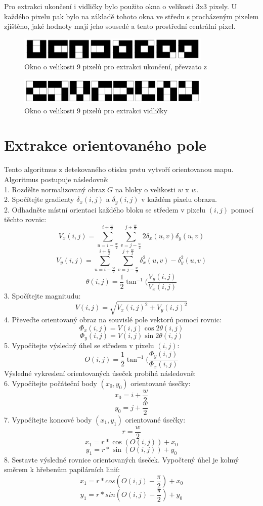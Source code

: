 Pro extrakci ukončení i vidličky bylo použito okna o velikosti 3x3 pixely. U každého pixelu pak bylo na základě tohoto okna ve středu s procházeným pixelem zjištěno, jaké hodnoty mají jeho sousedé a tento prostřední centrální pixel. 

\begin{figure}[htbp]
    \centering
    \includegraphics[width=350px]{obrazky-figures/windowridge.png}
    \caption{Okno o velikosti 9 pixelů pro extrakci ukončení, převzato z \cite{BansalStudy}}
\end{figure}
\begin{figure}[htbp]
    \centering
    \includegraphics[width=350px]{obrazky-figures/bif.png}
    \caption{Okno o velikosti 9 pixelů pro extrakci vidličky}
\end{figure}





\section{Extrakce orientovaného pole}
Tento algoritmus z detekovaného otisku prstu vytvoří orientovanou mapu. Algoritmus postupuje následovně:\\
1. Rozdělte normalizovaný obraz $G$ na bloky o velikosti $w$ x $w$.\\
2. Spočítejte gradienty $\delta_x$$(i, j)$ a $\delta_y$$(i, j)$ v každém pixelu obrazu. \\
2. Odhadněte místní orientaci každého bloku se středem v pixelu $(i, j)$ pomocí těchto rovnic:
$$V_x(i, j) = \sum_{u=i-\frac{w}{2}}^{i+\frac{w}{2}}\sum_{v=j-\frac{w}{2}}^{j+\frac{w}{2}} 2\delta_x(u,v)\delta_y(u,v)$$
$$V_y(i, j) = \sum_{u=i-\frac{w}{2}}^{i+\frac{w}{2}}\sum_{v=j-\frac{w}{2}}^{j+\frac{w}{2}} \delta_x^2(u,v) - \delta_y^2(u,v)$$
$$\theta(i, j) = \frac{1}{2}\tan^{-1}(\frac{V_y(i,j)}{V_x(i, j)}$$
3. Spočítejte magnitudu:
$$V(i,j) = \sqrt{V_x(i,j)^2 + V_y(i,j)^2}$$
4. Převeďte orientovaný obraz na souvislé pole vektorů pomocí rovnic:
$$\Phi_x(i,j) = V(i,j)\cos{2\theta(i,j)}$$
$$\Phi_y(i,j) = V(i,j)\sin{2\theta(i,j)}$$
5. Vypočítejte výsledný úhel se středem v pixelu $(i, j)$:
$$O(i, j) = \frac{1}{2}\tan^{-1}(\frac{\Phi_y(i,j)}{\Phi_x(i, j)}$$
Výsledné vykreslení orientovaných úseček probíhá následovně:\\
6. Vypočítejte počáteční body $(x_0,y_0)$ orientované úsečky:\\
$$x_0 = i + \frac{w}{2}$$
$$y_0 = j + \frac{w}{2}$$
7. Vypočítejte koncové body $(x_1,y_1)$ orientované úsečky:\\
$$r = \frac{w}{2}$$
$$x_1 = r * \cos({O(i,j)})+ x_0$$
$$y_1 = r * \sin({O(i,j)})+ y_0$$
8. Sestavte výsledné rovnice orientovaných úseček. Vypočtený úhel je kolmý směrem k hřebenům papilárních linií:\\
$$x_1 = r * cos(O(i,j)- \frac{\pi}{2}) + x_0$$
$$y_1 = r * sin(O(i,j)- \frac{\pi}{2}) + y_0$$

